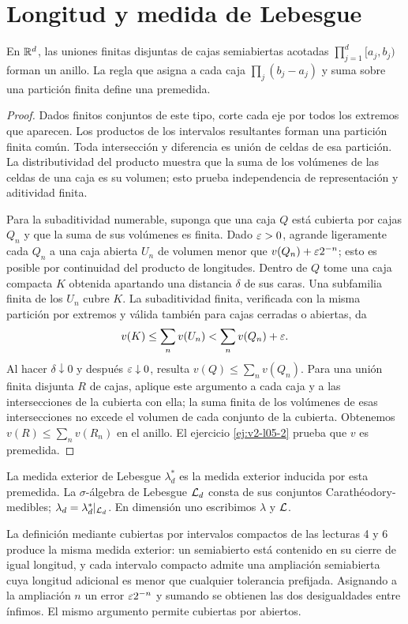 \section{Longitud y medida de Lebesgue}\label{lectura:v2-06}
\begin{lema}\label{lema:v2-cajas}
En $\mathbb R^d$, las uniones finitas disjuntas de cajas semiabiertas acotadas $\prod_{j=1}^d[a_j,b_j)$ forman un anillo. La regla que asigna a cada caja $\prod_j(b_j-a_j)$ y suma sobre una partición finita define una premedida.
\end{lema}
\begin{proof}
Dados finitos conjuntos de este tipo, corte cada eje por todos los extremos que aparecen. Los productos de los intervalos resultantes forman una partición finita común. Toda intersección y diferencia es unión de celdas de esa partición. La distributividad del producto muestra que la suma de los volúmenes de las celdas de una caja es su volumen; esto prueba independencia de representación y aditividad finita.

Para la subaditividad numerable, suponga que una caja $Q$ está cubierta por cajas $Q_n$ y que la suma de sus volúmenes es finita. Dado $\varepsilon>0$, agrande ligeramente cada $Q_n$ a una caja abierta $U_n$ de volumen menor que $v(Q_n)+\varepsilon2^{-n}$; esto es posible por continuidad del producto de longitudes. Dentro de $Q$ tome una caja compacta $K$ obtenida apartando una distancia $\delta$ de sus caras. Una subfamilia finita de los $U_n$ cubre $K$. La subaditividad finita, verificada con la misma partición por extremos y válida también para cajas cerradas o abiertas, da
\[v(K)\le\sum_nv(U_n)<\sum_nv(Q_n)+\varepsilon.\]
Al hacer $\delta\downarrow0$ y después $\varepsilon\downarrow0$, resulta $v(Q)\le\sum_nv(Q_n)$. Para una unión finita disjunta $R$ de cajas, aplique este argumento a cada caja y a las intersecciones de la cubierta con ella; la suma finita de los volúmenes de esas intersecciones no excede el volumen de cada conjunto de la cubierta. Obtenemos $v(R)\le\sum_nv(R_n)$ en el anillo. El ejercicio \ref{ej:v2-l05-2} prueba que $v$ es premedida.
\end{proof}
\begin{definicion}
La medida exterior de Lebesgue $\lambda_d^*$ es la medida exterior inducida por esta premedida. La $\sigma$-álgebra de Lebesgue $\mathcal L_d$ consta de sus conjuntos Carathéodory-medibles; $\lambda_d=\lambda_d^*|_{\mathcal L_d}$. En dimensión uno escribimos $\lambda$ y $\mathcal L$.
\end{definicion}
La definición mediante cubiertas por intervalos compactos de las lecturas 4 y 6 produce la misma medida exterior: un semiabierto está contenido en su cierre de igual longitud, y cada intervalo compacto admite una ampliación semiabierta cuya longitud adicional es menor que cualquier tolerancia prefijada. Asignando a la ampliación $n$ un error $\varepsilon2^{-n}$ y sumando se obtienen las dos desigualdades entre ínfimos. El mismo argumento permite cubiertas por abiertos.

